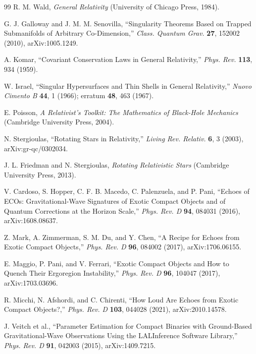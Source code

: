 \documentclass[11pt]{article}
\begin{document}
\begin{thebibliography}{99}
 R. M. Wald, \textit{General Relativity} (University of Chicago Press, 1984).

 G. J. Galloway and J. M. M. Senovilla, ``Singularity Theorems Based on Trapped Submanifolds of Arbitrary Co-Dimension,'' \textit{Class. Quantum Grav.} \textbf{27}, 152002 (2010), arXiv:1005.1249.

 A. Komar, ``Covariant Conservation Laws in General Relativity,'' \textit{Phys. Rev.} \textbf{113}, 934 (1959).

 W. Israel, ``Singular Hypersurfaces and Thin Shells in General Relativity,'' \textit{Nuovo Cimento B} \textbf{44}, 1 (1966); erratum \textbf{48}, 463 (1967).

 E. Poisson, \textit{A Relativist's Toolkit: The Mathematics of Black-Hole Mechanics} (Cambridge University Press, 2004).

 N. Stergioulas, ``Rotating Stars in Relativity,'' \textit{Living Rev. Relativ.} \textbf{6}, 3 (2003), arXiv:gr-qc/0302034.

 J. L. Friedman and N. Stergioulas, \textit{Rotating Relativistic Stars} (Cambridge University Press, 2013).

 V. Cardoso, S. Hopper, C. F. B. Macedo, C. Palenzuela, and P. Pani, ``Echoes of ECOs: Gravitational-Wave Signatures of Exotic Compact Objects and of Quantum Corrections at the Horizon Scale,'' \textit{Phys. Rev. D} \textbf{94}, 084031 (2016), arXiv:1608.08637.

 Z. Mark, A. Zimmerman, S. M. Du, and Y. Chen, ``A Recipe for Echoes from Exotic Compact Objects,'' \textit{Phys. Rev. D} \textbf{96}, 084002 (2017), arXiv:1706.06155.

 E. Maggio, P. Pani, and V. Ferrari, ``Exotic Compact Objects and How to Quench Their Ergoregion Instability,'' \textit{Phys. Rev. D} \textbf{96}, 104047 (2017), arXiv:1703.03696.

 R. Micchi, N. Afshordi, and C. Chirenti, ``How Loud Are Echoes from Exotic Compact Objects?,'' \textit{Phys. Rev. D} \textbf{103}, 044028 (2021), arXiv:2010.14578.

 J. Veitch et al., ``Parameter Estimation for Compact Binaries with Ground-Based Gravitational-Wave Observations Using the LALInference Software Library,'' \textit{Phys. Rev. D} \textbf{91}, 042003 (2015), arXiv:1409.7215.


\end{thebibliography}
\end{document}
